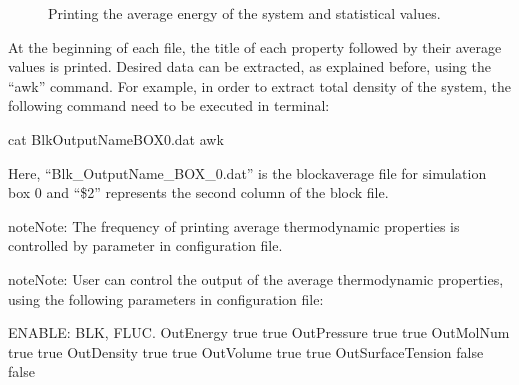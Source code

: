 \documentclass[letterpaper,10pt,english]{sphinxmanual}
\begin{document}
\begin{figure}[htbp]
\centering
\capstart

\noindent{}
\caption{Printing the average energy of the system and statistical values.}\label{\detokenize{output_file:id5}}\end{figure}

\sphinxAtStartPar
At the beginning of each file, the title of each property followed by their average values is printed.
Desired data can be extracted, as explained before, using the “awk” command. For example, in order to
extract total density of the system, the following command need to be executed in terminal:

\begin{sphinxVerbatim}[commandchars=\\\{\}]
\PYGZdl{} cat Blk\PYGZus{}OutputName\PYGZus{}BOX\PYGZus{}0.dat  awk 
\end{sphinxVerbatim}

\sphinxAtStartPar
Here, “Blk\_OutputName\_BOX\_0.dat” is the block\sphinxhyphen{}average file for simulation box 0 and “\$2” represents the
second column of the block file.

\begin{sphinxadmonition}{note}{Note:}
\sphinxAtStartPar
The frequency of printing average thermodynamic properties is controlled by 
parameter in configuration file.
\end{sphinxadmonition}

\begin{sphinxadmonition}{note}{Note:}
\sphinxAtStartPar
User can control the output of the average thermodynamic properties,  using the following
parameters in configuration file:

\begin{sphinxVerbatim}[commandchars=\\\{\}]
\PYGZsh{}\PYGZsh{}\PYGZsh{}\PYGZsh{}\PYGZsh{}\PYGZsh{}\PYGZsh{}\PYGZsh{}\PYGZsh{}\PYGZsh{}\PYGZsh{}\PYGZsh{}\PYGZsh{}\PYGZsh{}\PYGZsh{}\PYGZsh{}\PYGZsh{}\PYGZsh{}\PYGZsh{}\PYGZsh{}\PYGZsh{}\PYGZsh{}\PYGZsh{}\PYGZsh{}\PYGZsh{}\PYGZsh{}\PYGZsh{}\PYGZsh{}\PYGZsh{}\PYGZsh{}\PYGZsh{}\PYGZsh{}\PYGZsh{}
\PYGZsh{} ENABLE:         BLK, FLUC.
\PYGZsh{}\PYGZsh{}\PYGZsh{}\PYGZsh{}\PYGZsh{}\PYGZsh{}\PYGZsh{}\PYGZsh{}\PYGZsh{}\PYGZsh{}\PYGZsh{}\PYGZsh{}\PYGZsh{}\PYGZsh{}\PYGZsh{}\PYGZsh{}\PYGZsh{}\PYGZsh{}\PYGZsh{}\PYGZsh{}\PYGZsh{}\PYGZsh{}\PYGZsh{}\PYGZsh{}\PYGZsh{}\PYGZsh{}\PYGZsh{}\PYGZsh{}\PYGZsh{}\PYGZsh{}\PYGZsh{}\PYGZsh{}\PYGZsh{}
OutEnergy         true  true
OutPressure       true  true
OutMolNum         true  true
OutDensity        true  true
OutVolume         true  true
OutSurfaceTension false false
\end{sphinxVerbatim}
\end{sphinxadmonition}
\end{document}
